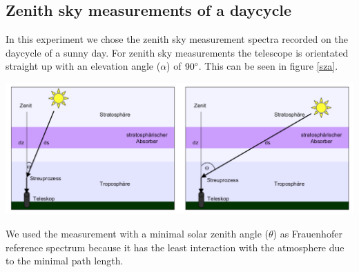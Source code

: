 \documentclass[12pt, english]{scrartcl} %
\newenvironment{Figure}
  {\par\medskip\noindent\minipage{\linewidth}}
  {\endminipage\par\medskip}
\begin{document}
\begin{multicols}{2}
\subsection{Zenith sky measurements of a daycycle}
In this experiment we chose the zenith sky measurement spectra recorded on the daycycle of a sunny day. For zenith sky measurements the telescope is orientated straight up with an elevation angle ($\alpha$) of $90 \degree $. This can be seen in figure \ref{sza}.\\
\begin{Figure}
 \centering
 \captionsetup{format=plain}
 \includegraphics[width=\linewidth]{graphics/sza.png}
 \label{sza}
\end{Figure}
We used the measurement with a minimal solar zenith angle ($\theta$) as Frauenhofer reference spectrum because it has the least interaction with the atmosphere due to the minimal path length. 

\end{multicols}
\end{document}
